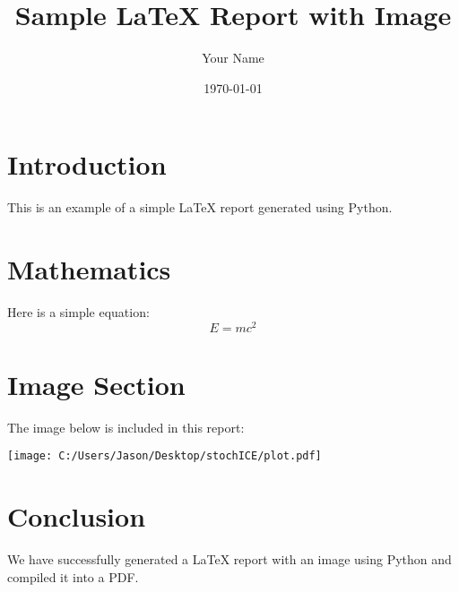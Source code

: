 \documentclass{article}
\title{Sample LaTeX Report with Image}
\author{Your Name}
\date{\today}
\begin{document}
        \maketitle

        \section{Introduction}
        This is an example of a simple LaTeX report generated using Python.
        
        \section{Mathematics}
        Here is a simple equation:
        \begin{equation}
            E = mc^2
        \end{equation}

        \section{Image Section}
        The image below is included in this report:

        \begin{center}
        \texttt{[image: C:/Users/Jason/Desktop/stochICE/plot.pdf]}
        \end{center}

        \section{Conclusion}
        We have successfully generated a LaTeX report with an image using Python and compiled it into a PDF.

        
\end{document}
